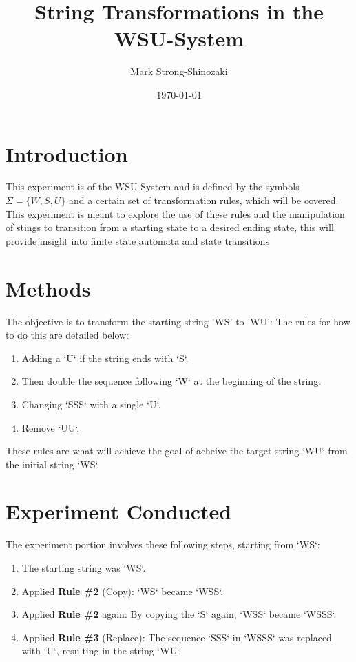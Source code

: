 \documentclass{article}
\title{String Transformations in the WSU-System}
\author{Mark Strong-Shinozaki}
\date{\today}
\begin{document}
\maketitle

\section{Introduction}
This experiment is of the WSU-System and is defined by the symbols \(\Sigma = \{W, S, U\}\) and a certain set of transformation rules, which will be covered. This experiment is meant to explore the use of these rules and the manipulation of stings to transition from a starting state to a desired ending state, this will provide insight into finite state automata and state transitions 

\section{Methods}
The objective is to transform the starting string 'WS' to 'WU': The rules for how to do this are detailed below:
\begin{enumerate}
    \item Adding a `U` if the string ends with `S`.
    \item Then double the sequence following `W` at the beginning of the string.
    \item Changing `SSS` with a single `U`.
    \item Remove `UU`.
    
 
\end{enumerate}
These rules are what will achieve the goal of acheive the target string `WU` from the initial string `WS`.

\section{Experiment Conducted}
The experiment portion involves these following steps, starting from `WS`:
\begin{enumerate}
    \item The starting string was `WS`.
    \item Applied \textbf{Rule \#2} (Copy): `WS` became `WSS`.
    \item Applied \textbf{Rule \#2} again: By copying the `S` again, `WSS` became `WSSS`.
    \item Applied \textbf{Rule \#3} (Replace): The sequence `SSS` in `WSSS` was replaced with `U`, resulting in the string `WU`.
\end{enumerate}
\end{document}
